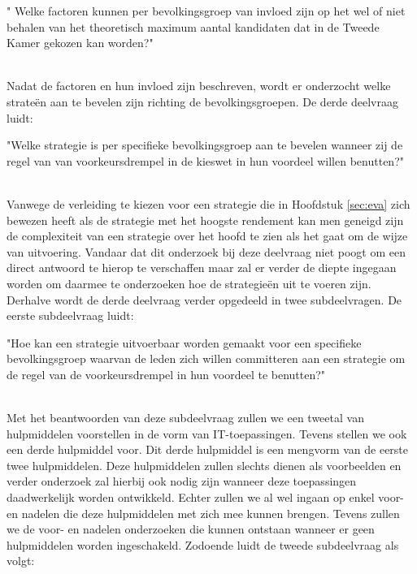 \begin{DV}" Welke factoren kunnen per bevolkingsgroep van invloed zijn op het wel of niet behalen van het theoretisch maximum aantal kandidaten dat in de Tweede Kamer gekozen kan worden?"\\\
\end{DV}

Nadat de factoren en hun invloed zijn beschreven, wordt er onderzocht welke strate\"{e}n aan te bevelen zijn richting de bevolkingsgroepen. De derde deelvraag luidt:\\

\begin{DV}"Welke strategie is per specifieke bevolkingsgroep aan te bevelen wanneer zij de regel van van voorkeursdrempel in de kieswet in hun voordeel willen benutten?"\\\
\end{DV}

Vanwege de verleiding te kiezen voor een strategie die in Hoofdstuk \ref{sec:eva} zich bewezen heeft als de strategie met het hoogste rendement kan men geneigd zijn de complexiteit van een strategie over het hoofd te zien als het gaat om de wijze van uitvoering. Vandaar dat dit onderzoek bij deze deelvraag niet poogt om een direct antwoord te hierop te verschaffen maar zal er verder de diepte ingegaan worden om daarmee te onderzoeken hoe de strategie\"{e}n uit te voeren zijn. Derhalve wordt de derde deelvraag verder opgedeeld in twee subdeelvragen. De eerste subdeelvraag luidt:\\

\begin{SDV}"Hoe kan een strategie uitvoerbaar worden gemaakt voor een specifieke bevolkingsgroep waarvan de leden zich willen committeren aan een strategie om de regel van de voorkeursdrempel in hun voordeel te benutten?"\\\
\end{SDV}

Met het beantwoorden van deze subdeelvraag zullen we een tweetal van hulpmiddelen voorstellen in de vorm van IT-toepassingen. Tevens stellen we ook een derde hulpmiddel voor. Dit derde hulpmiddel is een mengvorm van de eerste twee hulpmiddelen. Deze hulpmiddelen zullen slechts dienen als voorbeelden en verder onderzoek zal hierbij ook nodig zijn wanneer deze toepassingen daadwerkelijk worden ontwikkeld. Echter zullen we al wel ingaan op enkel voor- en nadelen die deze hulpmiddelen met zich mee kunnen brengen. Tevens zullen we de voor- en nadelen onderzoeken die kunnen ontstaan wanneer er geen hulpmiddelen worden ingeschakeld. Zodoende luidt de tweede subdeelvraag als volgt: \\\

